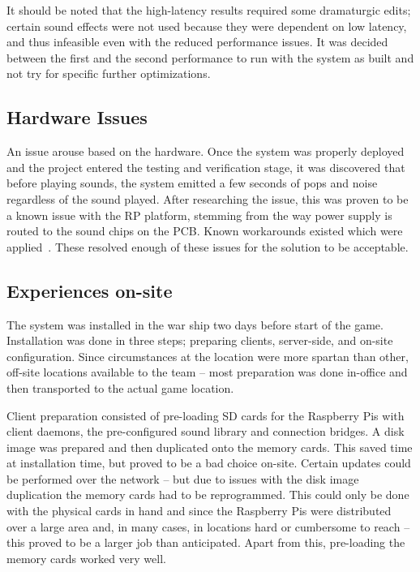 It should be noted that the high-latency results required some
dramaturgic edits; certain sound effects were not used because they
were dependent on low latency, and thus infeasible even with the
reduced performance issues. It was decided between the first and the
second performance to run with the system as built and not try for
specific further optimizations.

\subsection{Hardware Issues}
\label{sec:hardware-issues}
An issue arouse based on the hardware. Once the system was properly deployed and the project entered
the testing and verification stage, it was discovered that before playing sounds, the system emitted a few seconds of pops and noise regardless of the sound played. After researching the issue, this was proven to be a known issue with the RP platform, stemming from the way power supply is routed to the sound chips on the PCB\@. Known workarounds existed which were applied~\cite{rpi-bug-128}. These resolved enough of these issues for the solution to be acceptable.

\subsection{Experiences on-site}
\label{sec:experiences-on-site}

The system was installed in the war ship two days before start of the game. Installation was done in three steps; preparing clients, server-side, and on-site configuration. Since circumstances at the location were more spartan than other, off-site locations available to the team -- most preparation was done in-office and then transported to the actual game location. 

Client preparation consisted of pre-loading SD cards for the Raspberry Pis with client daemons, the pre-configured sound library and connection bridges. A disk image was prepared and then duplicated onto the memory cards. This saved time at installation time, but proved to be a bad choice on-site. Certain updates could be performed over the network -- but due to issues with the disk image duplication the memory cards had to be reprogrammed. This could only be done with the physical cards in hand and since the Raspberry Pis were distributed over a large area and, in many cases, in locations hard or cumbersome to reach -- this proved to be a larger job than anticipated. Apart from this, pre-loading the memory cards worked very well. 

